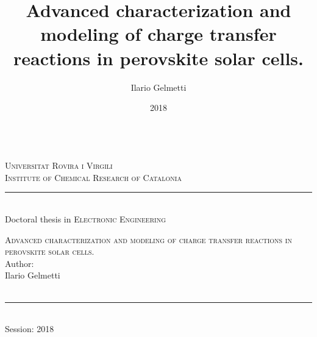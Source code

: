 \documentclass[b5paper, 12pt, openright]{book} %
\title{Advanced characterization and modeling of charge transfer reactions in perovskite solar cells.}
\author{Ilario Gelmetti}
\date{2018}
\begin{document}
\pagestyle{plain}

\frontmatter

{\let\cleardoublepage\clearpage %

\begin{titlepage}\begin{center}



	\\%
	\bigskip
	\large{\textsc{Universitat Rovira i Virgili\\ Institute of Chemical Research of Catalonia}}\\
		\rule{5cm}{1pt}\\
	{
\smallskip
	{Doctoral thesis in \textsc{Electronic Engineering}}}\\
\vfill

	\huge{\textsc{Advanced characterization and modeling of charge transfer reactions in perovskite solar cells.}}\\
\vfill
	\footnotesize{Author:}\\
	\large{Ilario Gelmetti}\\
		\makebox[.2\textwidth]{\rule{0pt}{.02\textheight}}\\
\end{center}
\begin{small}
\bigskip\bigskip\bigskip\bigskip
	\begin{center}
	\rule{3cm}{1pt}\\
	Session: 2018\\
	\end{center}
\end{small}
\end{titlepage}

}
\end{document}
